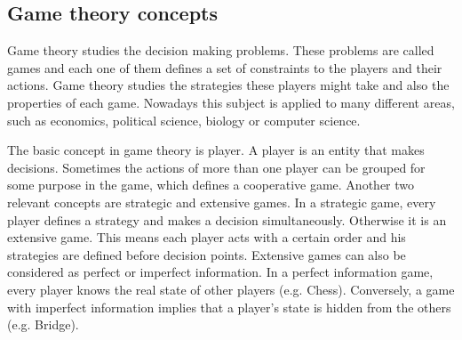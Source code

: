 \subsection{Game theory concepts}

Game theory studies the decision making problems.
These problems are called games and each one of them defines a set of constraints to the players and their actions.
Game theory studies the strategies these players might take and also the properties of each game.
Nowadays this subject is applied to many different areas, such as economics, political science, biology or computer science.

The basic concept in game theory is player.
A player is an entity that makes decisions.
Sometimes the actions of more than one player can be grouped for some purpose in the game, which defines a cooperative game.
Another two relevant concepts are strategic and extensive games.
In a strategic game, every player defines a strategy and makes a decision simultaneously.
Otherwise it is an extensive game.
This means each player acts with a certain order and his strategies are defined before decision points.
Extensive games can also be considered as perfect or imperfect information.
In a perfect information game, every player knows the real state of other players (e.g. Chess).
Conversely, a game with imperfect information implies that a player's state is hidden from the others (e.g. Bridge).

